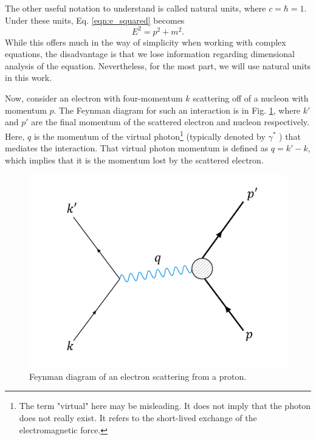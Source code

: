 The other useful notation to understand is called natural units, where $c=\hbar=1$. Under these units, Eq. \ref{eqn:e_squared} becomes
\begin{equation}
E^2 = p^2 + m^2.
\end{equation}
While this offers much in the way of simplicity when working with complex equations, the disadvantage is that we lose information regarding dimensional analysis of the equation. Nevertheless, for the most part, we will use natural units in this work.

Now, consider an electron with four-momentum $k$ scattering off of a nucleon with momentum $p$. The Feynman diagram for such an interaction is in Fig. \ref{fig:feyn_epscatt}, where $k'$ and $p'$ are the final momentum of the scattered electron and nucleon respectively. Here, $q$ is the momentum of the virtual photon\footnote{The term "virtual" here may be misleading. It does not imply that the photon does not really exist. It refers to the short-lived exchange of the electromagnetic force.} (typically denoted by $\gamma^{*}$ ) that mediates the interaction. That virtual photon momentum is defined as $q=k'-k$, which implies that it is the momentum lost by the scattered electron.

\begin{figure}[h!]
	\centering
	\includegraphics[width=0.6\linewidth]{figures/feyn_epscatt.png}
	\caption{Feynman diagram of an electron scattering from a proton.}
	\label{fig:feyn_epscatt}
\end{figure}

